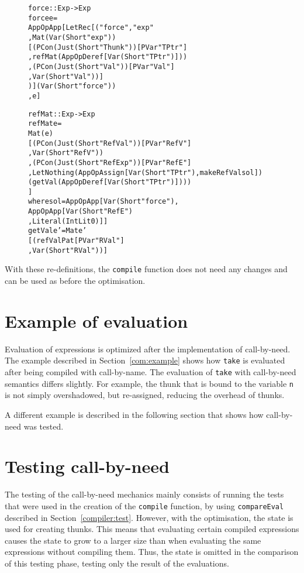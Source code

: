 \begin{figure}[H]
\begin{alltt}
  force :: Exp -> Exp
  force e =
    App OpApp [LetRec [("force", "exp"
                       , Mat (Var (Short "exp"))
                         [(PCon (Just (Short "Thunk")) [PVar "TPtr"]
                          ,refMat (App OpDeref [Var (Short "TPtr")]))
                         ,(PCon (Just (Short "Val")) [PVar "Val"]
                          , Var (Short "Val"))]
                       )] (Var (Short "force"))
              , e]

  refMat :: Exp -> Exp
  refMat e =
    Mat (e)
    [(PCon (Just (Short "RefVal")) [PVar "RefV"]
     ,Var (Short "RefV"))
    ,(PCon (Just (Short "RefExp")) [PVar "RefE"]
     ,Let Nothing (App OpAssign [Var (Short "TPtr"), makeRefVal sol])
       (getVal (App OpDeref [Var (Short "TPtr")])))
    ]
    where sol = App OpApp [Var (Short "force"),
                           App OpApp [Var (Short "RefE")
                                     ,Literal (IntLit 0)]]
          getVal e' = Mat e'
                      [(refValPat [PVar "RVal"]
                       ,Var (Short "RVal"))]
\end{alltt}
\end{figure}
With these re-definitions, the \texttt{compile} function does not need any
changes and can be used as before the optimisation.

\section{Example of evaluation}
Evaluation of expressions is optimized after the implementation of call-by-need.
The example described in Section~\ref{com:example} shows how \texttt{take} is
evaluated after being compiled with call-by-name. The evaluation of \texttt{take}
with call-by-need semantics differs slightly. For example, the thunk that is bound
to the variable \texttt{n} is not simply overshadowed, but re-assigned, reducing
the overhead of thunks.

A different example is described in the following section that shows how
call-by-need was tested.

\section{Testing call-by-need}
The testing of the call-by-need mechanics mainly consists of running the tests
that were used in the creation of the \texttt{compile} function, by using
\texttt{compareEval} described in Section~\ref{compiler:test}. However, with
the optimisation, the state is used for creating thunks. This means that
evaluating certain compiled expressions causes the state to grow to a larger
size than when evaluating the same expressions without compiling them. Thus, the
state is omitted in the comparison of this testing phase, testing only the
result of the evaluations.

